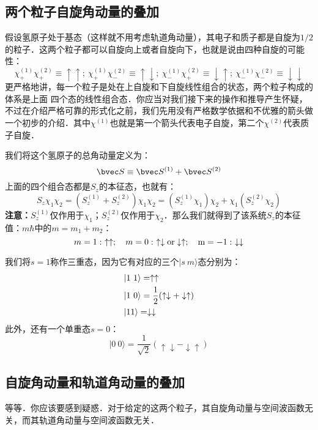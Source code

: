 
\subsection{两个粒子自旋角动量的叠加}
假设氢原子处于基态（这样就不用考虑轨道角动量），其电子和质子都是自旋为$1/2$的粒子．这两个粒子都可以自旋向上或者自旋向下，也就是说由四种自旋的可能性：
\begin{equation}
\chi^{(1)}_+\chi^{(2)}_+\equiv\uparrow\uparrow;\ \chi^{(1)}_+\chi^{(2)}_-\equiv\uparrow\downarrow;\ \chi^{(1)}_-\chi^{(2)}_+\equiv\downarrow\uparrow;\ \chi^{(1)}_-\chi^{(2)}_-\equiv\downarrow\downarrow
\end{equation}
更严格地讲，每一个粒子是处在上自旋和下自旋线性组合的状态，两个粒子构成的体系是上面
四个态的线性组合态．你应当对我们接下来的操作和推导产生怀疑，不过在介绍严格可靠的形式化之前，我们先用没有严格数学依据和不优雅的箭头做一个初步的介绍．其中$\chi^{(1)}$也就是第一个箭头代表电子自旋，第二个$\chi^{(2)}$代表质子自旋．

我们将这个氢原子的总角动量定义为：
\begin{equation}
\bvec S \equiv \bvec S^{(1)}+\bvec S^{(2)}
\end{equation}
上面的四个组合态都是$S_z$的本征态，也就有：
\begin{equation}
S_z\chi_1\chi_2=(S_z^{(1)}+S_z^{(2)})\chi_1\chi_2=(S_z^{(1)}\chi_1)\chi_2+\chi_1(S_z^{(2)}\chi_2)
\end{equation}
\textbf{注意：}$S_z^{(1)}$仅作用于$\chi_1$；$S_z^{(2)}$仅作用于$\chi_2$．那么我们就得到了该系统$S_z$的本征值：$m\hbar$中的$m=m_1+m_2$：
\begin{equation}
m=1: \ \uparrow\uparrow;\quad m=0: \ \uparrow\downarrow \rm{or} \downarrow\uparrow;\quad m=-1:\ \downarrow\downarrow
\end{equation}

我们将$s=1$称作三重态，因为它有对应的三个$|s\ m\rangle$态分别为：
\begin{align}
&|1 \ 1\rangle =\uparrow\uparrow\\
&|1 \ 0\rangle=\frac{1}{2}(\uparrow\downarrow+\downarrow\uparrow)\\
&|1 \-1\rangle=\downarrow\downarrow
\end{align}
此外，还有一个单重态$s=0$：
\begin{equation}
|0\ 0\rangle = \frac{1}{\sqrt{2}}(\uparrow\downarrow-\downarrow\uparrow)
\end{equation}

\subsection{自旋角动量和轨道角动量的叠加}
等等．你应该要感到疑惑．对于给定的这两个粒子，其自旋角动量与空间波函数无关，而其轨道角动量与空间波函数无关．
